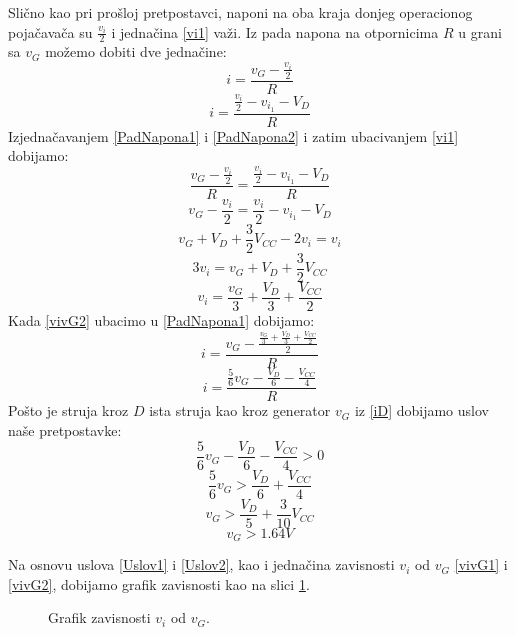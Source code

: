 \documentclass{article}
\begin{document}
\begin{enumerate}[itemsep=\baselineskip]
        Slično kao pri prošloj pretpostavci, naponi na oba kraja donjeg operacionog pojačavača su $\frac{v_i}{2}$ i jednačina \eqref{vi1} važi. Iz pada napona na otpornicima $R$ u grani sa $v_G$ možemo dobiti dve jednačine:
        \begin{equation}
            \label{PadNapona1}
            i = \frac{v_G - \frac{v_i}{2}}{R}
        \end{equation}
        \begin{equation}
            \label{PadNapona2}
            i = \frac{\frac{v_i}{2} - v_{i_1} - V_D}{R}
        \end{equation}
        Izjednačavanjem \eqref{PadNapona1} i \eqref{PadNapona2} i zatim ubacivanjem \eqref{vi1} dobijamo:
        $$\frac{v_G - \frac{v_i}{2}}{R} = \frac{\frac{v_i}{2} - v_{i_1} - V_D}{R}$$
        $$v_G - \frac{v_i}{2} = \frac{v_i}{2} - v_{i_1} - V_D$$
        $$v_G + V_D + \frac{3}{2}V_{CC} - 2v_i = v_i$$
        $$3v_i = v_G + V_D + \frac{3}{2}V_{CC}$$
        \begin{equation}
            \label{vivG2}
            \boxed{v_i = \frac{v_G}{3} + \frac{V_D}{3} + \frac{V_{CC}}{2}}
        \end{equation}
        Kada \eqref{vivG2} ubacimo u \eqref{PadNapona1} dobijamo:
        $$i = \frac{v_G - \frac{\frac{v_G}{3} + \frac{V_D}{3} + \frac{V_{CC}}{2}}{2}}{R}$$
        \begin{equation}
            \label{iD}
            i = \frac{\frac{5}{6}v_G - \frac{V_D}{6} - \frac{V_{CC}}{4}}{R}
        \end{equation}
        Pošto je struja kroz $D$ ista struja kao kroz generator $v_G$ iz \eqref{iD} dobijamo uslov naše pretpostavke:
        $$\frac{5}{6}v_G - \frac{V_D}{6} - \frac{V_{CC}}{4} > 0$$
        $$\frac{5}{6}v_G > \frac{V_D}{6} + \frac{V_{CC}}{4}$$
        $$v_G > \frac{V_D}{5} + \frac{3}{10}V_{CC}$$
        \begin{equation}
            \label{Uslov2}
            v_G > 1.64V
        \end{equation}

        Na osnovu uslova \eqref{Uslov1} i \eqref{Uslov2}, kao i jednačina zavisnosti $v_i$ od $v_G$ \eqref{vivG1} i \eqref{vivG2}, dobijamo grafik zavisnosti kao na slici \ref{Grafik2}.

        \begin{figure}[H]
            \begin{center}
                
            \end{center}
            \caption{Grafik zavisnosti $v_i$ od $v_G$.}
            \label{Grafik2}
        \end{figure}
    \end{enumerate}
\end{document}

